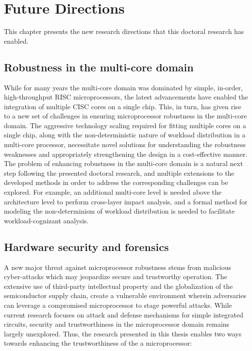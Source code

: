 \documentclass[12pt]{yalephd}
\begin{document}
\chapter{Future Directions}

This chapter presents the new research directions that this doctoral research has enabled.

\section{Robustness in the multi-core domain}
While for many years the multi-core domain was dominated by simple, in-order, high-throughput RISC microprocessors, the latest advancements have enabled the integration of multiple CISC cores on a single chip. This, in turn, has given rise to a new set of challenges in ensuring microprocessor robustness in the multi-core domain. The aggressive technology scaling required for fitting multiple cores on a single chip, along with the non-deterministic nature of workload distribution in a multi-core processor, necessitate novel solutions for understanding the robustness weaknesses and appropriately strengthening the design in a cost-effective manner. The problem of enhancing robustness in the multi-core domain is a natural next step following the presented doctoral research, and multiple extensions to the developed methods in order to address the corresponding challenges can be explored. For example, an additional multi-core level is needed above the architecture level to perform cross-layer impact analysis, and a formal method for modeling the non-determinism of workload distribution is needed to facilitate workload-cognizant analysis. 

\section{Hardware security and forensics}
A new major threat against microprocessor robustness stems from malicious cyber-attacks which may jeopardize secure and trustworthy operation. The extensive use of third-party intellectual property and the globalization of the semiconductor supply chain, create a vulnerable environment wherein adversaries can leverage a compromised microprocessor to stage powerful attacks. While current research focuses on attack and defense mechanisms for simple integrated circuits, security and trustworthiness in the microprocessor domain remains largely unexplored. Thus, the research presented in this thesis enables two ways towards enhancing the trustworthiness of the a microprocessor: 
\end{document}

